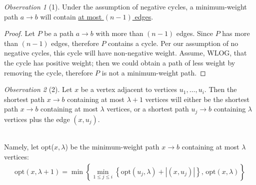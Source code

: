 \documentclass[12pt]{extarticle}
\theoremstyle{definition}
\theoremstyle{remark}
\newtheorem*{observation}{Observation}
\begin{document}
\begin{tcolorbox}[colback=white!95!black]
    \begin{observation}[1]
        Under the assumption of negative cycles, a minimum-weight path $a\to b$ will contain \ul{at most $(n-1)$ edges}.

        \begin{proof}
            Let $P$ be a path $a\to b$ with more than $(n-1)$ edges. Since $P$ has more than $(n-1)$ edges, therefore $P$ contains a cycle. Per our assumption of no negative cycles, this cycle will have non-negative weight. Assume, WLOG, that the cycle has positive weight; then we could obtain a path of less weight by removing the cycle, therefore $P$ is not a minimum-weight path.
        \end{proof}
    \end{observation}

    \begin{observation}[2]
        Let $x$ be a vertex adjacent to vertices $u_1,\hdots,u_i$. Then the shortest path $x\to b$ containing at most $\lambda+1$ vertices will either be the shortest path $x\to b$ containing at most $\lambda$ vertices, or a shortest path $u_j\to b$ containing $\lambda$ vertices plus the edge $(x,u_j)$. 

        ~\\
        Namely, let opt($x,\lambda$) be the minimum-weight path $x\to b$ containing at most $\lambda$ vertices:
        \begin{gather*}
            \text{opt}(x,\lambda+1)=\min\left\{\min_{1\leq j\leq i}\left\{\text{opt}(u_j,\lambda)+|(x,u_j)|\right\}\text{, opt}(x,\lambda)\right\}
        \end{gather*}
    \end{observation}
\end{tcolorbox}
\end{document}
